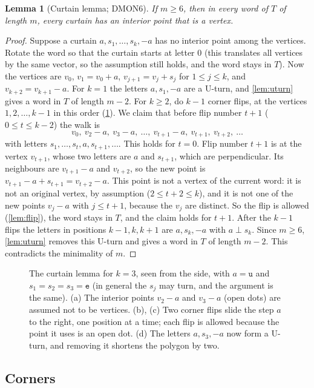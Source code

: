 \documentclass[11pt]{article}
\theoremstyle{plain}
\newtheorem{lemma}[theorem]{Lemma}
\theoremstyle{definition}
\theoremstyle{remark}
\newcommand{\word}[1]{\texttt{#1}}
\newcommand{\dmon}[1]{\textup{DMON#1}}
\begin{document}
\begin{lemma}[Curtain lemma; \dmon6]\label{lem:curtain}
If $m\ge6$, then in every word of $T$ of length $m$, every curtain has an interior point that is a
vertex.
\end{lemma}
\begin{proof}
Suppose a curtain $a,s_1,\dots,s_k,-a$ has no interior point among the vertices. Rotate the word so
that the curtain starts at letter $0$ (this translates all vertices by the same vector, so the
assumption still holds, and the word stays in $T$). Now the vertices are $v_0$, $v_1=v_0+a$,
$v_{j+1}=v_j+s_j$ for $1\le j\le k$, and $v_{k+2}=v_{k+1}-a$. For $k=1$ the letters $a,s_1,-a$ are a
U-turn, and \cref{lem:uturn} gives a word in $T$ of length $m-2$. For $k\ge2$, do $k-1$ corner flips,
at the vertices $1,2,\dots,k-1$ in this order (\cref{fig:curtain}). We claim that before flip number
$t+1$ ($0\le t\le k-2$) the walk is
\[ v_0,\ v_2-a,\ v_3-a,\ \dots,\ v_{t+1}-a,\ v_{t+1},\ v_{t+2},\ \dots \]
with letters $s_1,\dots,s_t,a,s_{t+1},\dots$. This holds for $t=0$. Flip number $t+1$ is at the vertex
$v_{t+1}$, whose two letters are $a$ and $s_{t+1}$, which are perpendicular. Its neighbours are
$v_{t+1}-a$ and $v_{t+2}$, so the new point is $v_{t+1}-a+s_{t+1}=v_{t+2}-a$. This point is not a vertex
of the current word: it is not an original vertex, by assumption ($2\le t+2\le k$), and it is not one
of the new points $v_j-a$ with $j\le t+1$, because the $v_j$ are distinct. So the flip is allowed
(\cref{lem:flip}), the word stays in $T$, and the claim holds for $t+1$. After the $k-1$ flips the
letters in positions $k-1,k,k+1$ are $a,s_k,-a$ with $a\perp s_k$. Since $m\ge6$, \cref{lem:uturn}
removes this U-turn and gives a word in $T$ of length $m-2$. This contradicts the minimality of $m$.
\end{proof}

\begin{figure}[t]
\centering
\FigCurtain
\caption{The curtain lemma for $k=3$, seen from the side, with $a=\word{u}$ and $s_1=s_2=s_3=\word{e}$
(in general the $s_j$ may turn, and the argument is the same). (a) The interior points $v_2-a$ and
$v_3-a$ (open dots) are assumed not to be vertices. (b), (c) Two corner flips slide the step $a$ to
the right, one position at a time; each flip is allowed because the point it uses is an open dot.
(d) The letters $a,s_3,-a$ now form a U-turn, and removing it shortens the polygon by two.}
\label{fig:curtain}
\end{figure}

\subsection{Corners}
\end{document}
